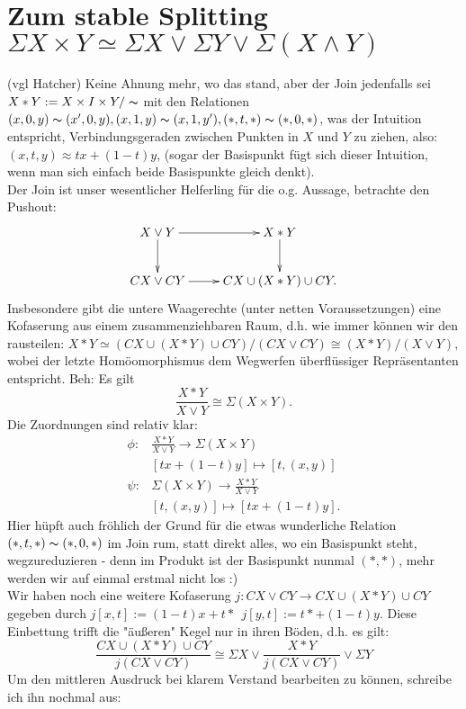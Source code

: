 \documentclass[11pt,twoside,a4paper]{scrbook} %
\begin{document}
\section{Zum stable Splitting $\Sigma X\times Y \simeq \Sigma X \vee \Sigma Y \vee \Sigma(X\wedge Y)$}
(vgl Hatcher) Keine Ahnung mehr, wo das stand, aber der Join jedenfalls sei $X\ast Y := X\times I \times Y / \thicksim$ mit
den Relationen $(x,0,y)\thicksim(x',0,y),(x,1,y)\thicksim(x,1,y'),(*,t,*)\thicksim(*,0,*)$, was der Intuition entspricht, Verbindungsgeraden zwischen
Punkten in $X$ und $Y$ zu ziehen, also: $(x,t,y)\approx tx + (1-t)y$, (sogar der Basispunkt f\"ugt sich dieser Intuition, wenn man sich
einfach beide Basispunkte gleich denkt).\\
Der Join ist unser wesentlicher Helferling f\"ur die o.g. Aussage, betrachte den Pushout:
$$\xymatrix{
X\vee Y\ar[r]\ar[d] & X\ast Y \ar[d]\\
CX\vee CY \ar[r]&CX\cup( X\ast Y) \cup CY.
}$$
Insbesondere gibt die untere Waagerechte (unter netten Voraussetzungen) eine Kofaserung aus einem zusammenziehbaren
Raum, d.h. wie immer k\"onnen wir den rausteilen: $X\ast Y\simeq (CX\cup( X\ast Y) \cup CY)/(CX\vee CY) \cong (X\ast Y)/(X\vee Y),$
wobei der letzte Hom\"oomorphismus dem Wegwerfen \"uberfl\"ussiger Repr\"asentanten entspricht. Beh: Es gilt $$\frac{X\ast Y}{X\vee Y}\cong \Sigma(X\times Y).$$
Die Zuordnungen sind relativ klar:
$$\begin{aligned}
\phi\colon & \frac{X\ast Y}{X\vee Y} \rightarrow \Sigma(X\times Y)\\
&[tx+(1-t)y]\mapsto [t,(x,y)]\\
\psi\colon & \Sigma(X\times Y) \rightarrow\frac{X\ast Y}{X\vee Y}\\
&[t,(x,y)]\mapsto [tx+(1-t)y].
\end{aligned}$$
Hier h\"upft auch fr\"ohlich der Grund f\"ur die etwas wunderliche Relation $(*,t,*)\thicksim(*,0,*)$ im Join rum, statt direkt alles, wo ein Basispunkt steht, wegzureduzieren - denn im Produkt
ist der Basispunkt nunmal $(*,*)$, mehr werden wir auf einmal erstmal nicht los :)\\
Wir haben noch eine weitere Kofaserung $j\colon CX\vee CY \rightarrow CX\cup(X\ast Y)\cup CY$ gegeben durch
$j[x,t]:=(1-t)x+t* ~~ j[y,t]:=t* + (1-t)y.$
Diese Einbettung trifft die "\"au\ss eren" Kegel nur in ihren B\"oden, d.h. es gilt:
$$\frac{CX\cup(X\ast Y)\cup CY}{j(CX\vee CY)}\cong \Sigma X \vee \frac{X\ast Y}{j(CX\vee CY)}\vee \Sigma Y$$
Um den mittleren Ausdruck bei klarem Verstand bearbeiten zu k\"onnen, schreibe ich ihn nochmal aus:
\end{document}
